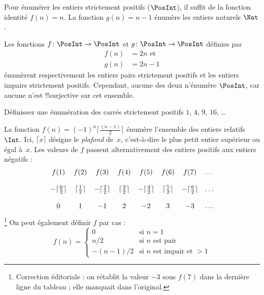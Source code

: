 \documentclass[11pt,a4paper,openany]{memoir}
\begin{document}
\begin{ex}
Pour énumérer les entiers strictement positifs ($\PosInt$), il suffit
de la fonction identité $f(n) = n$. La fonction $g(n) = n - 1$
énumère les entiers naturels $\Nat$.
\end{ex}

\begin{ex}
Les fonctions $f\colon \PosInt \to \PosInt$ et
$g \colon \PosInt \to \PosInt$ définies par
\begin{align*}
f(n) & = 2n \text{ et}\\
g(n) & = 2n - 1
\end{align*}
énumèrent respectivement les entiers pairs strictement positifs et
les entiers impairs strictement positifs. Cependant, aucune des deux
n’énumère $\PosInt$, car aucune n’est !!{surjective} sur cet ensemble.
\end{ex}

\begin{prob}
Définissez une énumération des carrés strictement positifs
$1$, $4$, $9$, $16$, \dots
\end{prob}

\begin{ex}
La fonction $f(n) = (-1)^{n} \lceil \frac{(n-1)}{2}\rceil$ énumère
l’ensemble des entiers relatifs~$\Int$. Ici, $\lceil x \rceil$ désigne
le \emph{plafond} de~$x$, c’est-à-dire le plus petit entier supérieur
ou égal à~$x$. Les valeurs de $f$ passent alternativement des entiers
positifs aux entiers négatifs :
\[
\begin{array}{c c c c c c c c}
f(1) & f(2) & f(3) & f(4) & f(5) & f(6) & f(7) & \dots \\ \\
- \lceil \tfrac{0}{2} \rceil & \lceil \tfrac{1}{2}\rceil & - \lceil \tfrac{2}{2} \rceil & \lceil \tfrac{3}{2} \rceil & - \lceil \tfrac{4}{2} \rceil  & \lceil \tfrac{5}{2}
\rceil & - \lceil \tfrac{6}{2} \rceil & \dots \\ \\
0 & 1 & -1 & 2 & -2 & 3 & -3 & \dots
\end{array}
\]
\footnote{Correction éditoriale : on rétablit la valeur $-3$ sous
$f(7)$ dans la dernière ligne du tableau ; elle manquait dans l’original.}
On peut également définir $f$ par cas :
\[
f(n) = \begin{cases}
  0 & \text{si $n = 1$}\\
  n/2 & \text{si $n$ est pair}\\
  -(n-1)/2 & \text{si $n$ est impair et $>1$}
  \end{cases}
\]
\end{ex}
\end{document}
